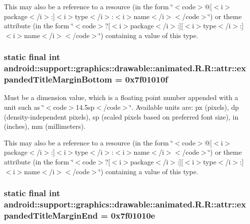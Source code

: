 This may also be a reference to a resource (in the form \char`\"{}$<$code$>$@\mbox{[}$<$i$>$package$<$/i$>$:\mbox{]}$<$i$>$type$<$/i$>$:$<$i$>$name$<$/i$>$$<$/code$>$\char`\"{}) or theme attribute (in the form \char`\"{}$<$code$>$?\mbox{[}$<$i$>$package$<$/i$>$:\mbox{]}\mbox{[}$<$i$>$type$<$/i$>$:\mbox{]}$<$i$>$name$<$/i$>$$<$/code$>$\char`\"{}) containing a value of this type. \hypertarget{classandroid_1_1support_1_1graphics_1_1drawable_1_1animated_1_1_r_1_1attr_532b3aedbfd99b39bc906a505621d700}{
\subsubsection[{expandedTitleMarginBottom}]{\setlength{\rightskip}{0pt plus 5cm}static final int android::support::graphics::drawable::animated.R.R::attr::expandedTitleMarginBottom = 0x7f01010f}}
\label{classandroid_1_1support_1_1graphics_1_1drawable_1_1animated_1_1_r_1_1attr_532b3aedbfd99b39bc906a505621d700}


Must be a dimension value, which is a floating point number appended with a unit such as \char`\"{}$<$code$>$14.5sp$<$/code$>$\char`\"{}. Available units are: px (pixels), dp (density-independent pixels), sp (scaled pixels based on preferred font size), in (inches), mm (millimeters). 

This may also be a reference to a resource (in the form \char`\"{}$<$code$>$@\mbox{[}$<$i$>$package$<$/i$>$:\mbox{]}$<$i$>$type$<$/i$>$:$<$i$>$name$<$/i$>$$<$/code$>$\char`\"{}) or theme attribute (in the form \char`\"{}$<$code$>$?\mbox{[}$<$i$>$package$<$/i$>$:\mbox{]}\mbox{[}$<$i$>$type$<$/i$>$:\mbox{]}$<$i$>$name$<$/i$>$$<$/code$>$\char`\"{}) containing a value of this type. \hypertarget{classandroid_1_1support_1_1graphics_1_1drawable_1_1animated_1_1_r_1_1attr_94b9e9902fd14a03c838859651c7d857}{
\subsubsection[{expandedTitleMarginEnd}]{\setlength{\rightskip}{0pt plus 5cm}static final int android::support::graphics::drawable::animated.R.R::attr::expandedTitleMarginEnd = 0x7f01010e}}
\label{classandroid_1_1support_1_1graphics_1_1drawable_1_1animated_1_1_r_1_1attr_94b9e9902fd14a03c838859651c7d857}


